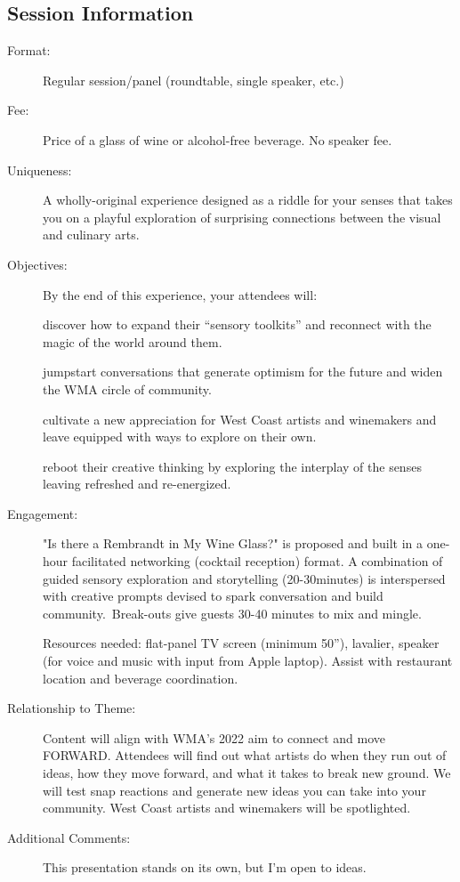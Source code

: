 \documentclass{report}
\begin{document}
              \subsection*{Session Information}
                \begin{description}
                  \item [Format:] Regular session/panel (roundtable, single speaker, etc.)
							    
								  \item [Fee:]Price of a glass of wine or alcohol-free beverage. No speaker fee. 
							     
							    \item [Uniqueness:]A wholly-original experience designed as a riddle for your senses that takes you on a playful exploration of surprising connections between the visual and culinary arts.
							    \item [Objectives:]By the end of this experience, your attendees will:

discover how to expand their “sensory toolkits” and reconnect with the magic of the world around them.

jumpstart conversations that generate optimism for the future and widen the WMA circle of community.

cultivate a new appreciation for West Coast artists and winemakers and leave equipped with ways to explore on their own. 

reboot their creative thinking by exploring the interplay of the senses leaving refreshed and re-energized.
							    \item [Engagement:]"Is there a Rembrandt in My Wine Glass?" is proposed and built in a one-hour facilitated networking (cocktail reception) format. A combination of guided sensory exploration and storytelling (20-30minutes) is interspersed with creative prompts devised to spark conversation and build community. Break-outs give guests 30-40 minutes to mix and mingle.

Resources needed: flat-panel TV screen (minimum 50”), lavalier, speaker (for voice and music with input from Apple laptop). Assist with restaurant location and beverage coordination.
							    \item [Relationship to Theme:]Content will align with WMA’s 2022 aim to connect and move FORWARD. Attendees will find out what artists do when they run out of ideas, how they move forward, and what it takes to break new ground. We will test snap reactions and generate new ideas you can take into your community. West Coast artists and winemakers will be spotlighted.
							    
                    \item [Additional Comments: ]This presentation stands on its own, but I'm open to ideas.

                \end{description}
\end{document}
